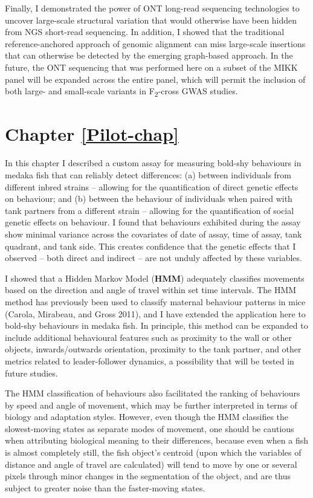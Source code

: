 \documentclass[
]{book}
\begin{document}
Finally, I demonstrated the power of ONT long-read sequencing technologies to uncover large-scale structural variation that would otherwise have been hidden from NGS short-read sequencing. In addition, I showed that the traditional reference-anchored approach of genomic alignment can miss large-scale insertions that can otherwise be detected by the emerging graph-based approach. In the future, the ONT sequencing that was performed here on a subset of the MIKK panel will be expanded across the entire panel, which will permit the inclusion of both large- and small-scale variants in F\textsubscript{2}-cross GWAS studies.

\hypertarget{chapter-refpilot-chap}{%
\section*{Chapter \ref{Pilot-chap}}\label{chapter-refpilot-chap}}

In this chapter I described a custom assay for measuring bold-shy behaviours in medaka fish that can reliably detect differences: (a) between individuals from different inbred strains -- allowing for the quantification of direct genetic effects on behaviour; and (b) between the behaviour of individuals when paired with tank partners from a different strain -- allowing for the quantification of social genetic effects on behaviour. I found that behaviours exhibited during the assay show minimal variance across the covariates of date of assay, time of assay, tank quadrant, and tank side. This creates confidence that the genetic effects that I observed -- both direct and indirect -- are not unduly affected by these variables.

I showed that a Hidden Markov Model (\textbf{HMM}) adequately classifies movements based on the direction and angle of travel within set time intervals. The HMM method has previously been used to classify maternal behaviour patterns in mice (Carola, Mirabeau, and Gross 2011), and I have extended the application here to bold-shy behaviours in medaka fish. In principle, this method can be expanded to include additional behavioural features such as proximity to the wall or other objects, inwards/outwards orientation, proximity to the tank partner, and other metrics related to leader-follower dynamics, a possibility that will be tested in future studies.

The HMM classification of behaviours also facilitated the ranking of behaviours by speed and angle of movement, which may be further interpreted in terms of biology and adaptation styles. However, even though the HMM classifies the slowest-moving states as separate modes of movement, one should be cautious when attributing biological meaning to their differences, because even when a fish is almost completely still, the fish object's centroid (upon which the variables of distance and angle of travel are calculated) will tend to move by one or several pixels through minor changes in the segmentation of the object, and are thus subject to greater noise than the faster-moving states.
\end{document}

